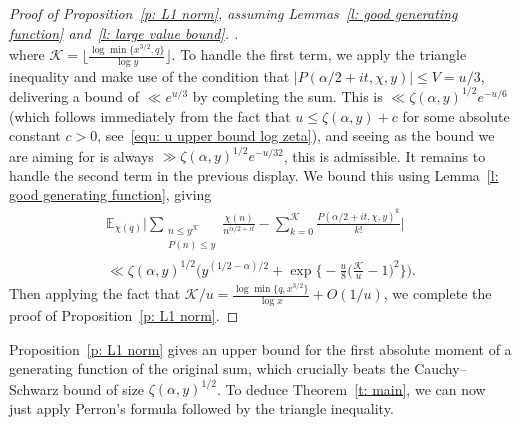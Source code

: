 \documentclass[a4paper,12pt,reqno]{amsart}
\newcommand{\E}{\mathbb{E}}
\begin{document}
\begin{proof}[Proof of Proposition~\ref{p: L1 norm}, assuming Lemmas~\ref{l: good generating function} and~\ref{l: large value bound}. ]
\[\]
where $\mathcal{K} = \lfloor \frac{\log \min \{ x^{3/2}, q \}}{\log y} \rfloor$. To handle the first term, we apply the triangle inequality and make use of the condition that $|P (\alpha/2 + it, \chi, y)| \leq V = u/3$, delivering a bound of $\ll e^{u/3}$ by completing the sum. This is $\ll \zeta (\alpha, y)^{1/2} e^{-u/6}$ (which follows immediately from the fact that $u \leq \zeta(\alpha, y) + c$ for some absolute constant $c>0$, see~\eqref{equ: u upper bound log zeta}), and seeing as the bound we are aiming for is always $\gg \zeta (\alpha, y)^{1/2} e^{-u/32}$, this is admissible. It remains to handle the second term in the previous display. We bound this using Lemma~\ref{l: good generating function}, giving
\begin{multline*}
\E_{\chi (q)} \biggl| \sum_{\substack{n \leq y^{\mathcal{K}} \\ P(n) \leq y}} \frac{\chi(n)}{n^{\alpha / 2 + it}} - \sum_{k = 0}^{\mathcal{K}} \frac{P (\alpha / 2 + it, \chi, y)^{k}}{k!} \biggr| \\ 
\ll \zeta (\alpha, y)^{1/2} \biggl(y^{(1/2 - \alpha)/2} + \exp \biggl\{ - \frac{u}{8} \biggl( \frac{\mathcal{K}}{u} -1 \biggr)^2 \biggr\} \biggr) .
\end{multline*}
Then applying the fact that $\mathcal{K}/u = \frac{\log \min\{ q, x^{3/2} \}}{\log x} + O(1/u)$, we complete the proof of Proposition~\ref{p: L1 norm}.
\end{proof}

Proposition~\ref{p: L1 norm} gives an upper bound for the first absolute moment of a generating function of the original sum, which crucially beats the Cauchy--Schwarz bound of size $\zeta(\alpha,y)^{1/2}$. To deduce Theorem~\ref{t: main}, we can now just apply Perron's formula followed by the triangle inequality.
\end{document}
